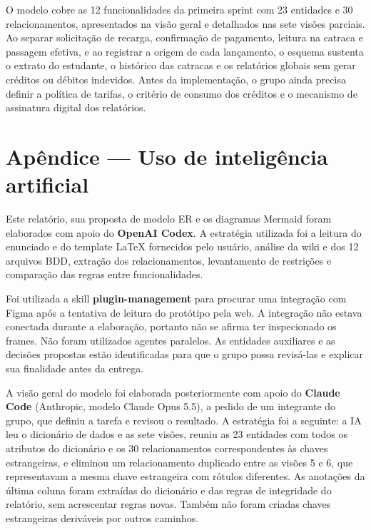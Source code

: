 \documentclass[
  brazilian,
  12pt,
  a4paper,
]{article}
\begin{document}
O modelo cobre as 12 funcionalidades da primeira sprint com 23 entidades
e 30 relacionamentos, apresentados na visão geral e detalhados nas sete
visões parciais. Ao separar solicitação de recarga, confirmação de
pagamento, leitura na catraca e passagem efetiva, e ao registrar a
origem de cada lançamento, o esquema sustenta o extrato do estudante, o
histórico das catracas e os relatórios globais sem gerar créditos ou
débitos indevidos. Antes da implementação, o grupo ainda precisa definir
a política de tarifas, o critério de consumo dos créditos e o mecanismo
de assinatura digital dos relatórios.

\section{Apêndice --- Uso de inteligência
artificial}\label{apuxeandice-uso-de-inteliguxeancia-artificial}

Este relatório, sua proposta de modelo ER e os diagramas Mermaid foram
elaborados com apoio do \textbf{OpenAI Codex}. A estratégia utilizada
foi a leitura do enunciado e do template LaTeX fornecidos pelo usuário,
análise da wiki e dos 12 arquivos BDD, extração dos relacionamentos,
levantamento de restrições e comparação das regras entre
funcionalidades.

Foi utilizada a skill \textbf{plugin-management} para procurar uma
integração com Figma após a tentativa de leitura do protótipo pela web.
A integração não estava conectada durante a elaboração, portanto não se
afirma ter inspecionado os frames. Não foram utilizados agentes
paralelos. As entidades auxiliares e as decisões propostas estão
identificadas para que o grupo possa revisá-las e explicar sua
finalidade antes da entrega.

A visão geral do modelo foi elaborada posteriormente com apoio do
\textbf{Claude Code} (Anthropic, modelo Claude Opus 5.5), a pedido de um
integrante do grupo, que definiu a tarefa e revisou o resultado. A
estratégia foi a seguinte: a IA leu o dicionário de dados e as sete
visões, reuniu as 23 entidades com todos os atributos do dicionário e os
30 relacionamentos correspondentes às chaves estrangeiras, e eliminou um
relacionamento duplicado entre as visões 5 e 6, que representavam a
mesma chave estrangeira com rótulos diferentes. As anotações da última
coluna foram extraídas do dicionário e das regras de integridade do
relatório, sem acrescentar regras novas. Também não foram criadas chaves
estrangeiras deriváveis por outros caminhos.
\end{document}
